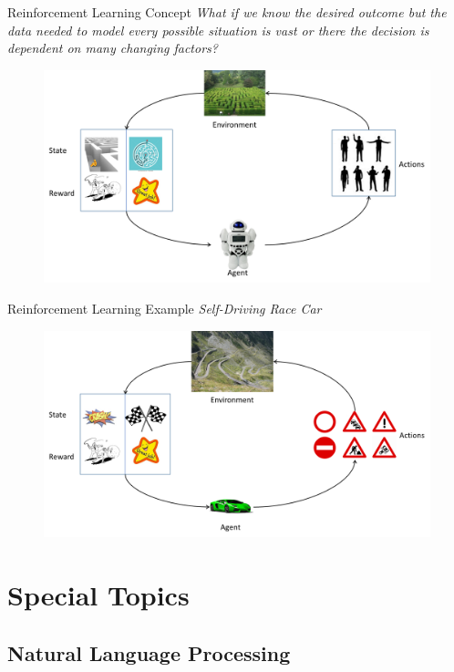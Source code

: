\documentclass[10pt]{beamer}
\begin{document}
\begin{frame}{Reinforcement Learning Concept}
\emph{What if we know the desired outcome but the data needed to model every possible situation is vast or there the decision is dependent on many changing factors?}
		\begin{figure}
			\includegraphics[width=1.00\textwidth, center, trim=0cm 0cm 0 0cm]{images/RL_concept.png}
	\end{figure}
\end{frame}

\begin{frame}{Reinforcement Learning Example}
\emph{Self-Driving Race Car}
		\begin{figure}
			\includegraphics[width=1.00\textwidth, center, trim=0cm 0cm 0 0cm]{images/RL_example.png}
	\end{figure}
\end{frame}

\section{Special Topics}

\subsection{Natural Language Processing}
\end{document}

